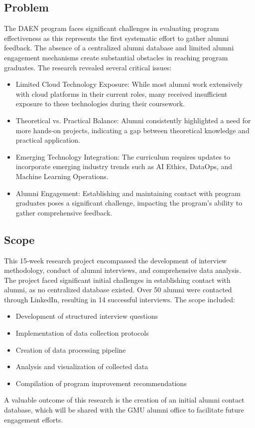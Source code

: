 \documentclass[12pt,a4paper]{article}
\begin{document}
\subsection{Problem}
The DAEN program faces significant challenges in evaluating program effectiveness as this represents the first systematic effort to gather alumni feedback. The absence of a centralized alumni database and limited alumni engagement mechanisms create substantial obstacles in reaching program graduates. The research revealed several critical issues:
\begin{itemize}
\item Limited Cloud Technology Exposure: While most alumni work extensively with cloud platforms in their current roles, many received insufficient exposure to these technologies during their coursework.
\item Theoretical vs. Practical Balance: Alumni consistently highlighted a need for more hands-on projects, indicating a gap between theoretical knowledge and practical application.
\item Emerging Technology Integration: The curriculum requires updates to incorporate emerging industry trends such as AI Ethics, DataOps, and Machine Learning Operations.
\item Alumni Engagement: Establishing and maintaining contact with program graduates poses a significant challenge, impacting the program's ability to gather comprehensive feedback.
\end{itemize}


\subsection{Scope}
This 15-week research project encompassed the development of interview methodology, conduct of alumni interviews, and comprehensive data analysis. The project faced significant initial challenges in establishing contact with alumni, as no centralized database existed. Over 50 alumni were contacted through LinkedIn, resulting in 14 successful interviews. The scope included:
\begin{itemize}
\item Development of structured interview questions
\item Implementation of data collection protocols
\item Creation of data processing pipeline
\item Analysis and visualization of collected data
\item Compilation of program improvement recommendations
\end{itemize}
A valuable outcome of this research is the creation of an initial alumni contact database, which will be shared with the GMU alumni office to facilitate future engagement efforts.
\end{document}
